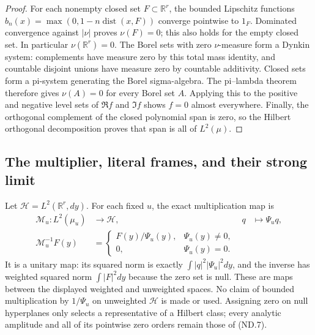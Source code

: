 \begin{proof}
For each nonempty closed set \(F\subset\mathbb R^r\), the bounded
Lipschitz functions
\(b_n(x)=\max(0,1-n\operatorname{dist}(x,F))\) converge pointwise
to \(1_F\). Dominated convergence against \(|\nu|\) proves
\(\nu(F)=0\); this also holds for the empty closed set. In particular
\(\nu(\mathbb R^r)=0\). The Borel sets with zero \(\nu\)-measure
form a Dynkin system: complements have measure zero by this total
mass identity, and countable disjoint unions have measure zero by
countable additivity. Closed sets form a pi-system generating the
Borel sigma-algebra. The pi--lambda theorem therefore gives
\(\nu(A)=0\) for every Borel set \(A\). Applying this to the
positive and negative level sets of \(\Re f\) and \(\Im f\)
shows \(f=0\) almost everywhere. Finally, the orthogonal complement
of the closed polynomial span is zero, so the Hilbert orthogonal
decomposition proves that span is all of \(L^2(\mu)\).
\end{proof}

\subsection{The multiplier, literal frames, and their strong limit}

Let \(\mathscr H=L^2(\mathbb R^r,dy)\). For each fixed \(u\),
the exact multiplication map is
\[
 \begin{aligned}
 \mathcal M_u:L^2(\mu_u)&\longrightarrow\mathscr H,
       &q&\longmapsto\Psi_u q,\\
 \mathcal M_u^{-1}F(y)&=
 \begin{cases}F(y)/\Psi_u(y),&\Psi_u(y)\ne0,\\
 0,&\Psi_u(y)=0.
 \end{cases}
 \end{aligned}
 \tag{ND.13}
\]
It is a unitary map: its squared norm is exactly
\(\int|q|^2|\Psi_u|^2dy\), and the inverse has weighted squared
norm \(\int|F|^2dy\) because the zero set is null. These are maps
between the displayed weighted and unweighted spaces. No claim of
bounded multiplication by \(1/\Psi_u\) on unweighted
\(\mathscr H\) is made or used. Assigning zero on null hyperplanes
only selects a representative of a Hilbert class; every analytic
amplitude and all of its pointwise zero orders remain those of (ND.7).

